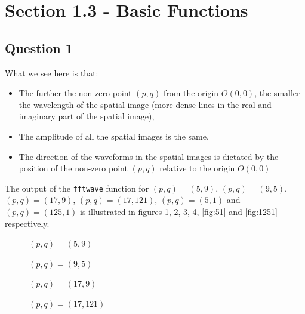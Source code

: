 \section{Section 1.3 - Basic Functions}  	
  	\subsection{Question 1}
  		What we see here is that:
  
  		\begin{itemize}
 
  		\item The further the non-zero point $(p,q)$ from the origin $O(0,0)$, the smaller the wavelength of the spatial image 
  		(more dense lines in the real and imaginary part of the spatial image),
  
  		\item The amplitude of all the spatial images is the same,
  
  		\item The direction of the waveforms in the spatial images is dictated by the position of the non-zero point $(p,q)$ relative to the origin $O(0,0)$
  
  		\end{itemize}
  		
  		
  		The output of the \texttt{fftwave} function for $(p,q)=(5,9)$, $(p,q)=(9,5)$, $(p,q)=(17,9)$, $(p,q)=(17,121)$, $(p,q)=(5,1)$ and $(p,q)=(125,1)$
  		is illustrated in figures \ref{fig:59}, \ref{fig:95}, \ref{fig:179}, \ref{fig:17121}, \ref{fig:51} and \ref{fig:1251} respectively.

	  	\begin{figure}[H]
			\centering
			\scalebox{0.7}{}
			\caption{$(p,q)=(5,9)$}
			\label{fig:59}
	  	\end{figure}
	  	
	  	\begin{figure}[H]
			\centering
			\scalebox{0.7}{}
			\caption{$(p,q)=(9,5)$}
			\label{fig:95}
	  	\end{figure}

	  	\begin{figure}[H]
			\centering
			\scalebox{0.7}{}
			\caption{$(p,q)=(17,9)$}
			\label{fig:179}
	  	\end{figure}
	  	
	  	\begin{figure}[H]
			\centering
			\scalebox{0.7}{}
			\caption{$(p,q)=(17,121)$}
			\label{fig:17121}
	  	\end{figure}
	  	
